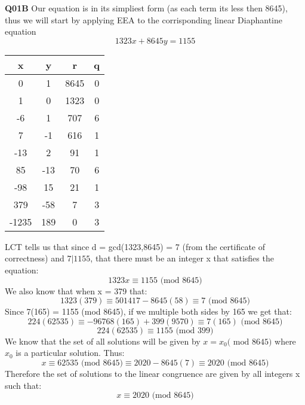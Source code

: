 \documentclass[11pt]{article}
\begin{document}
\textbf{Q01B} Our equation is in its simpliest form (as each term its less then 8645), thus we will start by applying EEA to the corrisponding linear Diaphantine equation
\[  1323x + 8645y = 1155 \]
\begin{center}
 \begin{tabular}{||c c c c||} 
 \hline
 x & y & r & q \\ [0.5ex] 
 \hline\hline
 0 & 1 & 8645 & 0 \\ 
 \hline
 1 & 0 & 1323 & 0 \\
 \hline
 -6 & 1 & 707 & 6 \\
 \hline
 7 & -1 & 616 & 1 \\
 \hline
 -13 &  2 & 91 & 1 \\ 
 \hline
 85 & -13  & 70 & 6 \\
 \hline
 -98 &  15 & 21 & 1 \\ 
 \hline
379 &  -58 & 7 & 3\\ 
 \hline
-1235 & 189 & 0 & 3\\ 
 \hline
\end{tabular}
\end{center}
 LCT tells us that since d = gcd(1323,8645) = 7 (from the certificate of correctness) and $7|1155$, that there must be an integer x that satisfies the equation:
\[  1323x \equiv 1155 \text{ (mod 8645)} \]
We also know that when x = 379 that:
\[  1323(379) \equiv 501417 - 8645(58) \equiv 7 \text{ (mod 8645)} \]
Since 7(165) = 1155 (mod 8645), if we multiple both sides by 165 we get that:
\[  224(62535) \equiv -96768(165) + 399(9570) \equiv 7(165) \text{ (mod 8645)} \]
\[  224(62535) \equiv 1155 \text{ (mod 399)} \]
We know that the set of all solutions will be given by $ x = x_0 \text{( mod 8645)} $ where $x_0$ is a particular solution. Thus:
\[  x \equiv 62535 \text{ (mod 8645)} \equiv 2020 - 8645(7) \equiv 2020 \text{ (mod 8645)} \]
Therefore the set of solutions to the linear congruence are given by all integers x such that:
\[  x \equiv 2020 \text{ (mod 8645)} \]
\end{document}
